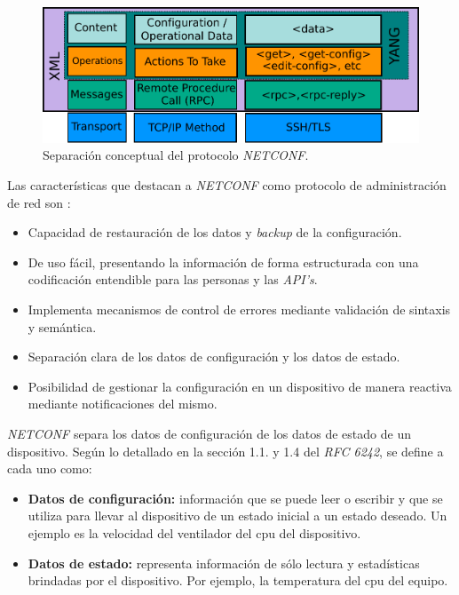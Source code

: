 \begin{figure}[htbp]
	\centering
	\includegraphics[scale=0.7]{Figures/stack-netconf.pdf}
	\caption{Separación conceptual del protocolo \textit{NETCONF}.}
	\label{fig:netconf}
  \end{figure}


  Las características que destacan a \textit{NETCONF} como protocolo de administración de red son \parencite{netconfpros}:

  \begin{itemize}
	\item Capacidad de restauración de los datos y \textit{backup} de la configuración.
	\item De uso fácil, presentando la información de forma estructurada con una codificación entendible para las personas y las \textit{API’s}.
	\item Implementa mecanismos de control de errores mediante validación de sintaxis y semántica.
	\item Separación clara de los datos de configuración y los datos de estado.
	\item Posibilidad de gestionar la configuración en un dispositivo de manera reactiva mediante notificaciones del mismo.
\end{itemize}

\textit{NETCONF} separa los datos de configuración de los datos de estado de un dispositivo. Según lo detallado en la sección 1.1. y 1.4 del \textit{RFC 6242}, se define a cada uno como:

\begin{itemize}
	\item \textbf{Datos de configuración:} información que se puede leer o escribir y que se utiliza para llevar al dispositivo de un estado inicial a un estado deseado. Un ejemplo es la velocidad del ventilador del cpu del dispositivo.  
	\item \textbf{Datos de estado:} representa información de sólo lectura y estadísticas brindadas por el dispositivo. Por ejemplo, la temperatura del cpu del equipo.   
\end{itemize}

